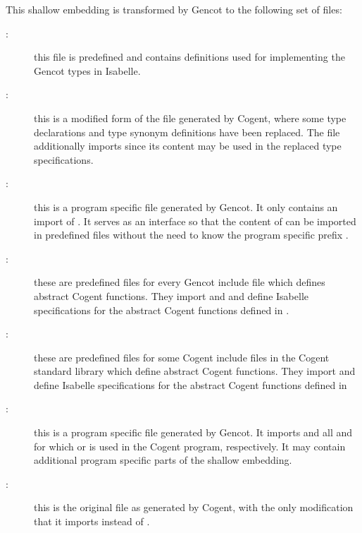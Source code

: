 This shallow embedding is transformed by Gencot to the following set of files:
\begin{description}
\item[:] this file is predefined and contains definitions used for implementing the Gencot 
types in Isabelle.
\item[:] this is a modified form of the file generated by Cogent, where some type 
declarations and type synonym definitions have been replaced. The file additionally imports 
since its content may be used in the replaced type specifications.
\item[:] this is a program specific file generated by Gencot. It only contains an import of 
. It serves as an interface so that the content of  can be
imported in predefined files without the need to know the program specific prefix .
\item[:] these are predefined files for every Gencot include file  which defines
abstract Cogent functions. They import  and  and define Isabelle
specifications for the abstract Cogent functions defined in .
\item[:] these are predefined files for some Cogent include files  in the 
Cogent standard library  which define abstract Cogent functions. They import 
and define Isabelle specifications for the abstract Cogent functions defined in 
\item[:] this is a program specific file generated by Gencot. It imports 
 and all  and  
for which  or  is used in the Cogent program, respectively. It may contain additional 
program specific parts of the shallow embedding. 
\item[:] this is the original file as generated by Cogent, with the only modification
that it imports  instead of .
\end{description}

